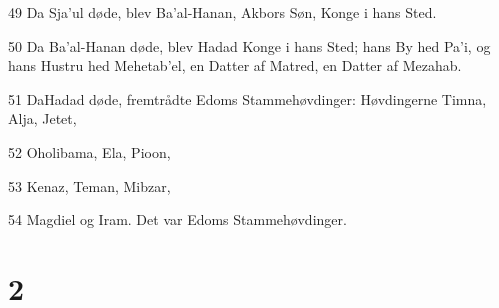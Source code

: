 \par 49 Da Sja'ul døde, blev Ba'al-Hanan, Akbors Søn, Konge i hans Sted.
\par 50 Da Ba'al-Hanan døde, blev Hadad Konge i hans Sted; hans By hed Pa'i, og hans Hustru hed Mehetab'el, en Datter af Matred, en Datter af Mezahab.
\par 51 DaHadad døde, fremtrådte Edoms Stammehøvdinger: Høvdingerne Timna, Alja, Jetet,
\par 52 Oholibama, Ela, Pioon,
\par 53 Kenaz, Teman, Mibzar,
\par 54 Magdiel og Iram. Det var Edoms Stammehøvdinger.

\chapter{2}

